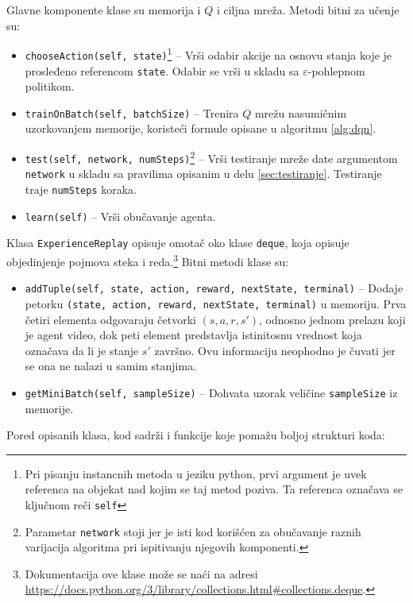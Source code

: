 Glavne komponente klase su memorija i $Q$ i ciljna mreža. Metodi bitni za učenje su:
\begin{itemize}
	\item \texttt{chooseAction(self, state)}\footnote{Pri pisanju instancnih metoda u jeziku python, prvi argument je uvek referenca na objekat nad kojim se taj metod poziva. Ta referenca označava se ključnom reči \texttt{self}} -- Vrši odabir akcije na osnovu stanja koje je prosleđeno referencom \texttt{state}. Odabir se vrši u skladu sa $\varepsilon$-pohlepnom politikom.
	\item \texttt{trainOnBatch(self, batchSize)} -- Trenira $Q$ mrežu nasumičnim uzorkovanjem memorije, koristeći formule opisane u algoritmu \ref{alg:dqn}.
	\item \texttt{test(self, network, numSteps)}\footnote{Parametar \texttt{network} stoji jer je isti kod korišćen za obučavanje raznih varijacija algoritma pri ispitivanju njegovih komponenti.} -- Vrši testiranje mreže date argumentom \texttt{network} u skladu sa pravilima opisanim u delu \ref{sec:testiranje}. Testiranje traje \texttt{numSteps} koraka.
	\item \texttt{learn(self)} -- Vrši obučavanje agenta. 
\end{itemize}
\par 
Klasa \texttt{ExperienceReplay} opisuje omotač oko klase \texttt{deque}, koja opisuje objedinjenje pojmova steka i reda.\footnote{Dokumentacija ove klase može se naći na adresi \url{https://docs.python.org/3/library/collections.html\#collections.deque}.} Bitni metodi klase su:
\begin{itemize}
	\item \texttt{addTuple(self, state, action, reward, nextState, terminal)} -- Dodaje petorku \texttt{(state, action, reward, nextState, terminal)} u memoriju. Prva četiri elementa odgovaraju četvorki $(s, a, r, s')$, odnosno jednom prelazu koji je agent video, dok peti element predstavlja istinitosnu vrednost koja označava da li je stanje $s'$ završno. Ovu informaciju neophodno je čuvati jer se ona ne nalazi u samim stanjima.
	\item \texttt{getMiniBatch(self, sampleSize)} -- Dohvata uzorak veličine \texttt{sampleSize} iz memorije.
\end{itemize}
\par 
Pored opisanih klasa, kod sadrži i funkcije koje pomažu boljoj strukturi koda:
